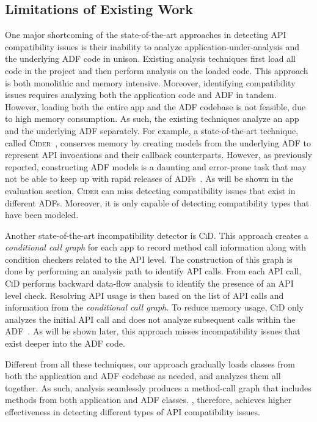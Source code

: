 \subsection{Limitations of Existing Work}
\label{limitations}
One major shortcoming of the state-of-the-art
approaches in detecting API compatibility issues is
their inability to analyze application-under-analysis
and the underlying ADF code in unison.  Existing
analysis techniques first load all code in the project and
then perform analysis on the loaded code.  This
approach is both monolithic and memory intensive.
Moreover, identifying compatibility issues requires analyzing both the application code and ADF in tandem. However, loading both the entire app and the ADF codebase is not feasible, due to high memory consumption. As such, the existing techniques  analyze an app and the underlying ADF separately.
For example, a state-of-the-art technique, called
\textsc{Cider}~\cite{huang2018understanding}, 
conserves memory by creating models from the
underlying ADF to represent API invocations and their callback counterparts. However, as previously reported, constructing ADF models is a daunting and error-prone task that may not be able to keep up with rapid releases of ADFs~\cite{vanderMerwe2012}.
As will be shown in the evaluation section, \textsc{Cider} can miss detecting compatibility issues that exist in different ADFs.
Moreover, it is only capable of detecting compatibility types that have been modeled.

Another state-of-the-art incompatibility detector is
\textsc{CiD}\cite{lili2018cid}. This approach creates a
\emph{conditional call graph} for each app to record
method call information along with condition checkers
related to the API level. The construction of this graph is
done by performing an analysis path to identify API
calls. From each API call, \textsc{CiD} performs
backward data-flow analysis to identify the presence of
an API level check. Resolving API usage is then based
on the list of API calls and information from the
\emph{conditional call graph}.  To reduce memory usage,
\textsc{CiD} only analyzes the initial API call and
does not analyze subsequent calls within the
ADF~\cite{lili2018cid}.  As will be shown later, this
approach misses incompatibility issues that exist
deeper into the ADF code.  


Different from all these techniques, our approach
gradually loads classes from both the
application and ADF codebase as needed, and analyzes them all together.  As such, \@approach analysis seamlessly produces a method-call graph that includes methods from both application and ADF classes.  \@approach, therefore, achieves higher effectiveness in detecting different types of API compatibility issues. 


